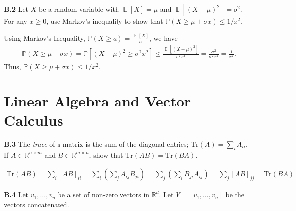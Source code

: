 \documentclass{article}
\DeclareMathOperator{\E}{\mathbb{E}}
\newenvironment{solution}{\begin{adjustwidth}{8mm}{}}{\end{adjustwidth}}
\begin{document}
\textbf{B.2}
Let $X$ be a random variable with $\E[X] = \mu$ and $\E[(X-\mu)^2] = \sigma^2$.
For any $x \geq 0$, use Markov's inequality to show that $\mathbb{P}(X \geq \mu + \sigma x) \leq 1/x^2$.

\begin{solution}
        Using Markov's Inequality, $\mathbb{P}(X \geq a) = \frac{\E[X]}{a}$, we have
        \begin{align*}
                \mathbb{P}(X \geq \mu + \sigma x)
                = \mathbb{P}[(X - \mu)^2 \geq \sigma^2 x^2] 
                \leq \frac{\E[(X - \mu)^2]}{\sigma^2 x^2} = \frac{\sigma^2}{\sigma^2 x^2} = \frac{1}{x^2}.
        \end{align*}
        Thus, $\mathbb{P}(X \geq \mu + \sigma x) \leq 1/x^2$.
\end{solution}


\section*{Linear Algebra and Vector Calculus}

\textbf{B.3}
The \textit{trace} of a matrix is the sum of the diagonal entries; $\text{Tr}(A) = \sum_i A_{ii}$.
If $A \in \mathbb{R}^{n \times m}$ and $B \in \mathbb{R}^{m \times n}$, show that $\text{Tr}(AB) = \text{Tr}(BA)$.

\begin{align*}
        \text{Tr}(AB) 
        = \sum_i [AB]_{ii}
        = \sum_i \left( \sum_j A_{ij} B_{ji} \right)
        = \sum_j \left( \sum_i B_{ji} A_{ij} \right)
        = \sum_j [AB]_{jj}
        = \text{Tr}(BA) 
\end{align*}

\textbf{B.4}
Let $v_1,\dots,v_n$ be a set of non-zero vectors in $\mathbb{R}^d$.
Let $V = [v_1, \dots, v_n]$ be the vectors concatenated.
\end{document}
